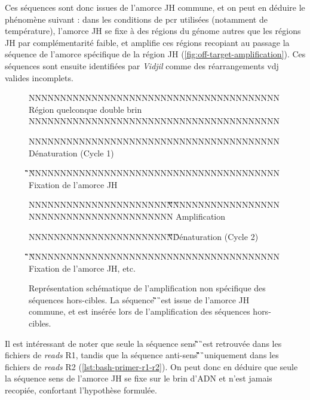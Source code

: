 Ces séquences sont donc issues de l'amorce JH commune, et on peut en déduire le
phénomène suivant : dans les conditions de \gls{pcr} utilisées (notamment de
température), l'amorce JH se fixe à des régions du génome autres que les
régions JH par complémentarité faible, et amplifie ces régions recopiant au
passage la séquence de l'amorce spécifique de la région JH
(\autoref{fig:off-target-amplification}). Ces séquences sont ensuite
identifiées par \textit{Vidjil} comme des réarrangements \gls{vdj} valides
incomplets.

\begin{figure}[H]
    \centering
    \begin{ColoredVerbatim}
        
        NNNNNNNNNNNNNNNNNNNNNNNNNNNNNNNNNNNNNNNN Région quelconque double brin
        NNNNNNNNNNNNNNNNNNNNNNNNNNNNNNNNNNNNNNNN

        NNNNNNNNNNNNNNNNNNNNNNNNNNNNNNNNNNNNNNNN Dénaturation (Cycle 1)

                               \C\G\T\C\T\C\C\T\C\A\G\G\T\A\A\G
        NNNNNNNNNNNNNNNNNNNNNNNNNNNNNNNNNNNNNNNN Fixation de l'amorce JH


        NNNNNNNNNNNNNNNNNNNNNNN\C\G\T\C\T\C\C\T\C\A\G\G\T\A\A\G
        NNNNNNNNNNNNNNNNNNNNNNNNNNNNNNNNNNNNNNNN Amplification

        NNNNNNNNNNNNNNNNNNNNNNN\C\G\T\C\T\C\C\T\C\A\G\G\T\A\A\G Dénaturation (Cycle 2)

                               \C\G\T\C\T\C\C\T\C\A\G\G\T\A\A\G
        NNNNNNNNNNNNNNNNNNNNNNNNNNNNNNNNNNNNNNNN Fixation de l'amorce JH, etc.
    \end{ColoredVerbatim}
    \caption{
        Représentation schématique de l'amplification non spécifique des séquences hors-cibles. 
        La séquence \C\G\T\C\T\C\C\T\C\A\G\G\T\A\A\G\ est issue de l'amorce JH commune, et est insérée 
        lors de l'amplification des séquences hors-cibles.
    }
    \label{fig:off-target-amplification}
\end{figure}

Il est intéressant de noter que seule la séquence sens
\C\G\T\C\T\C\C\T\C\A\G\G\T\A\A\G\ est retrouvée dans les fichiers de
\textit{reads} R1, tandis que la séquence anti-sens
\C\T\T\A\C\C\T\G\A\G\G\A\G\A\C\G\ uniquement dans les fichiers de
\textit{reads} R2 (\autoref{lst:bash-primer-r1-r2}). On peut donc en déduire
que seule la séquence sens de l'amorce JH se fixe sur le brin d'ADN et n'est
jamais recopiée, confortant l'hypothèse formulée.


